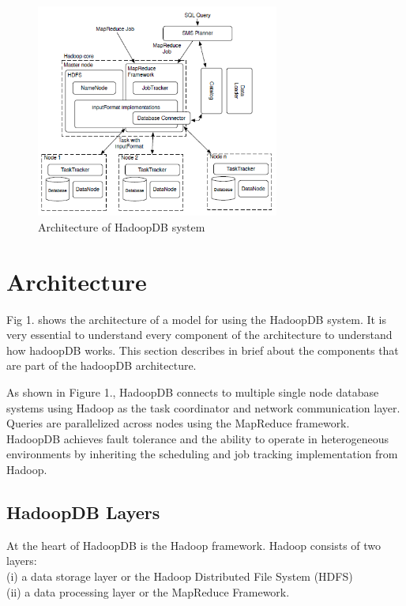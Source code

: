 \documentclass[9pt,twocolumn,twoside]{styles/osajnl}
\begin{document}
\begin{figure}[h]
    \centering
    \includegraphics[width=8cm]{images/hadoopDB.png}
    \caption{Architecture of HadoopDB system}
\end{figure}

\section{Architecture}

Fig 1. shows the architecture\cite{hadoop-guide} of a model for using the HadoopDB system. It is very essential to understand every component of the architecture to understand how hadoopDB works. This section describes in brief about the components that are part of the hadoopDB architecture.

As shown in Figure 1., HadoopDB connects to multiple single node database systems using Hadoop as the task coordinator and network communication layer. Queries are parallelized across nodes using the MapReduce framework. HadoopDB achieves fault tolerance and the ability to operate in heterogeneous environments by
inheriting the scheduling and job tracking implementation from Hadoop.

\subsection{HadoopDB Layers}
At the heart of HadoopDB is the Hadoop\cite{apache-hadoop} framework. Hadoop consists of two layers: \\(i) a data storage layer or the Hadoop \cite{apace-web-page} Distributed
File System (HDFS) \\(ii) a data processing layer or the MapReduce Framework.
\end{document}
